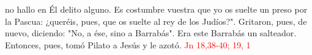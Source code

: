 no hallo en Él delito alguno. Es costumbre vuestra que yo os suelte un preso por la Pascua: ¿queréis, 
pues, que os suelte al rey de los Judíos?". Gritaron, pues, de nuevo, diciendo: "No, a ése, sino a Barrabás". 
Era este Barrabás un salteador. Entonces, pues, tomó Pilato a Jesús y le azotó. \textcolor{red}{Jn 18,38-40; 19, 1}